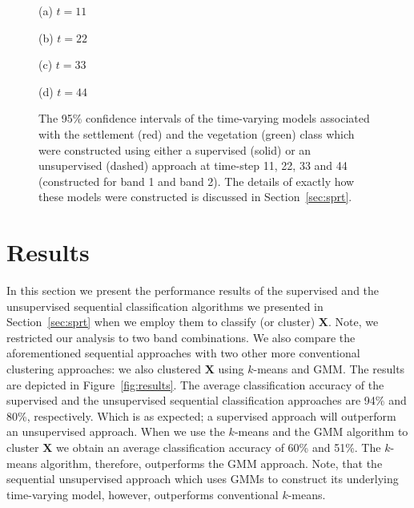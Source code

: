 \documentclass{article}
\begin{document}
\begin{figure}[h!]
\begin{minipage}[b]{.47\linewidth}
  \centering 
  \centerline{}
  \centerline{(a) $t=11$}\medskip
\end{minipage}
\hfill
\begin{minipage}[b]{0.47\linewidth}
  \centering
  \centerline{}
  \centerline{(b) $t=22$}\medskip
\end{minipage}

\begin{minipage}[b]{.47\linewidth}
  \centering 
  \centerline{}
  \centerline{(c) $t=33$}\medskip
\end{minipage}
\hfill
\begin{minipage}[b]{0.47\linewidth}
  \centering
  \centerline{}
  \centerline{(d) $t=44$}\medskip
\end{minipage}
\caption{The 95\% confidence intervals of the time-varying models associated with the settlement (red) and the vegetation (green) class which were constructed using either a supervised (solid) or an unsupervised (dashed) approach at time-step 11, 22, 33 and 44 (constructed 
for band 1 and band 2). The details of exactly how these models were constructed is discussed in Section~\ref{sec:sprt}.}
\label{fig:time_vary_model}
\end{figure}

\section{Results}
In this section we present the performance results of the supervised and the unsupervised sequential classification algorithms we presented in Section~\ref{sec:sprt} when we employ them to classify (or cluster) $\mathbf{X}$.
Note, we restricted our analysis to two band combinations. We also compare the aforementioned sequential approaches with two other more conventional clustering approaches: we also clustered $\mathbf{X}$ using $k$-means and GMM. The results are depicted in Figure~\ref{fig:results}. The average classification accuracy of the supervised and the unsupervised sequential classification approaches are 94\% and 80\%, respectively. Which is as expected; a supervised approach will outperform an unsupervised approach. When we use the $k$-means and the GMM algorithm to cluster $\mathbf{X}$ we obtain 
an average classification accuracy of 60\% and 51\%. The $k$-means algorithm, therefore, outperforms the GMM approach. Note, that the sequential unsupervised approach which uses 
GMMs to construct its underlying time-varying model, however, outperforms conventional $k$-means. 
\end{document}
